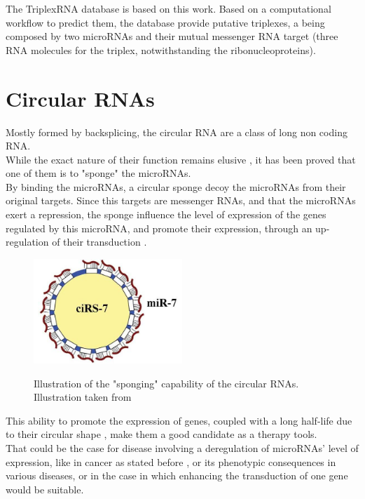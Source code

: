 \documentclass[a4paper,12pt]{report}
\begin{document}
The TriplexRNA database is based on this work. Based on a computational workflow to predict them\cite{triplex}, the database provide putative triplexes, a being composed by two microRNAs and their mutual messenger RNA target (three RNA molecules for the triplex, notwithstanding the ribonucleoproteins). 



\section{Circular RNAs}

Mostly formed by backsplicing\cite{diversity, sponge}, the circular RNA are a class of long non coding RNA.\\
While the exact nature of their function remains elusive \cite{diversity, mir7, sponge}, it has been proved that one of them is to "sponge" the microRNAs\cite{mir7,sponge}. \\

By binding the microRNAs, a circular sponge decoy the microRNAs from their original targets. Since this targets are messenger RNAs, and that the microRNAs exert a repression, the sponge influence the level of expression of the genes regulated by this microRNA, and promote their expression, through an up-regulation of their transduction \cite{mir7,carcinoma,sponge}.

\begin{figure}[H]
	\centering
	{\includegraphics[width=0.5\textwidth]{sponge.jpg}}
	\caption{Illustration of the "sponging" capability of the circular RNAs. Illustration taken from\cite{sponge}}
\end{figure}

This ability to promote the expression of genes, coupled with a long half-life due to their circular shape \cite{sponge}, make them a good candidate as a therapy tools. \\

That could be the case for disease involving a deregulation of microRNAs' level of expression, like in cancer as stated before \cite{cancer}, or its phenotypic consequences in various diseases\cite{therapeutics}, or in the case in which enhancing the transduction of one gene would be suitable.\\
\end{document}
